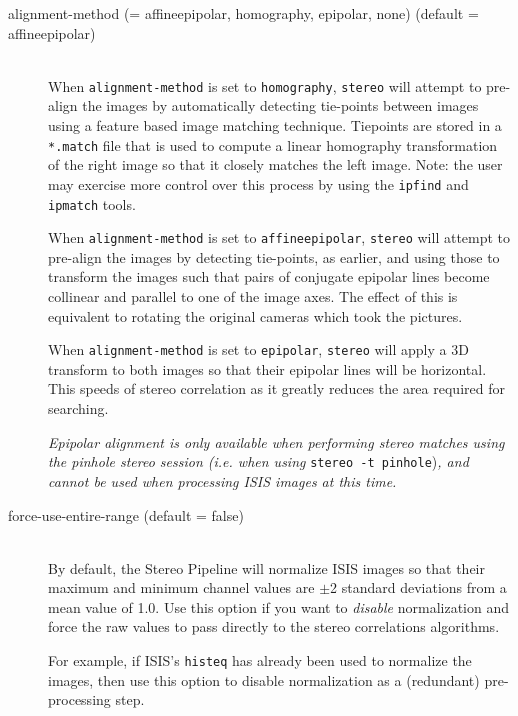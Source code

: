 \begin{description}

\item[alignment-method \textnormal{\small{(= affineepipolar, homography,
      epipolar, none)}} (default = affineepipolar)] \hfill \\

  When \texttt{alignment-method} is set to \texttt{homography},
  \texttt{stereo} will attempt to pre-align the images by
  automatically detecting tie-points between images using a feature
  based image matching technique. Tiepoints are stored in a
  \texttt{*.match} file that is used to compute a linear homography
  transformation of the right image so that it closely matches the
  left image.  Note: the user may exercise more control over this
  process by using the \texttt{ipfind} and \texttt{ipmatch} tools.

  When \texttt{alignment-method} is set to \texttt{affineepipolar},
  \texttt{stereo} will attempt to pre-align the images by detecting
  tie-points, as earlier, and using those to transform the images such
  that pairs of conjugate epipolar lines become collinear and parallel to
  one of the image axes.  The effect of this is equivalent to rotating the
  original cameras which took the pictures.

  When \texttt{alignment-method} is set to \texttt{epipolar},
  \texttt{stereo} will apply a 3D transform to both images so that
  their epipolar lines will be horizontal. This speeds of stereo
  correlation as it greatly reduces the area required for searching.

  {\em Epipolar alignment is only available when performing stereo
    matches using the pinhole stereo session (i.e. when using}
  \texttt{stereo -t pinhole}){\em, and cannot be used when processing
    ISIS images at this time.}

\item[force-use-entire-range \textnormal (default = false)] \hfill \\
  By default, the Stereo Pipeline will normalize ISIS images so that
  their maximum and minimum channel values are $\pm$2 standard
  deviations from a mean value of 1.0.  Use this option if you want to
  {\em disable} normalization and force the raw
  values to pass directly to the stereo correlations algorithms.

  For example, if ISIS's \texttt{histeq} has already been used to
  normalize the images, then use this option to disable normalization
  as a (redundant) pre-processing step.



\end{description}
